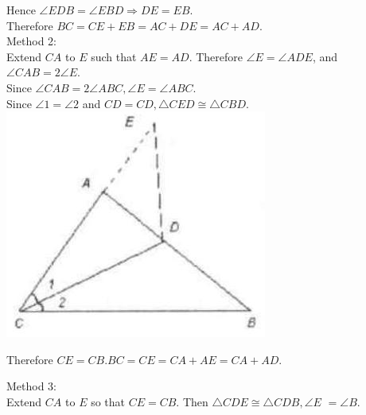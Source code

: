 \documentclass{article}
\begin{document}
Hence \(\angle E D B=\angle E B D \Rightarrow D E=E B\).\\
Therefore \(B C=C E+E B=A C+D E=A C+A D\).\\
Method 2:\\
Extend \(C A\) to \(E\) such that \(A E=A D\). Therefore \(\angle E=\angle A D E\), and \(\angle C A B=2 \angle E\).\\
Since \(\angle C A B=2 \angle A B C, \angle E=\angle A B C\).\\
Since \(\angle 1=\angle 2\) and \(C D=C D, \triangle C E D \cong \triangle C B D\).\\
\centering
\includegraphics[width=\textwidth]{images/056(2).jpg}

Therefore \(C E=C B . B C=C E=C A+A E=C A+A D\).


Method 3:\\
Extend \(C A\) to \(E\) so that \(C E=C B\). Then \(\triangle C D E \cong \triangle C D B, \angle E\) \(=\angle B\).
\end{document}
